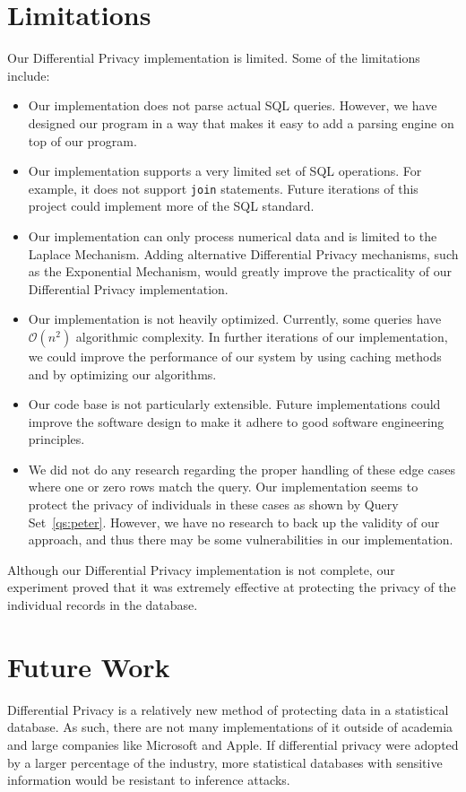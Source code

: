 \documentclass[conference,11pt]{IEEEtran}
\begin{document}
\section{Limitations}\label{sec:limitations}
Our Differential Privacy implementation is limited. Some of the limitations
include:
\begin{itemize}
    \item Our implementation does not parse actual SQL queries. However, we
        have designed our program in a way that makes it easy to add a parsing
        engine on top of our program.
    \item Our implementation supports a very limited set of SQL operations. For
        example, it does not support \texttt{join} statements.  Future
        iterations of this project could implement more of the SQL standard.
    \item Our implementation can only process numerical data and is limited to
        the Laplace Mechanism. Adding alternative Differential Privacy
        mechanisms, such as the Exponential Mechanism, would greatly improve the
        practicality of our Differential Privacy implementation.
    \item Our implementation is not heavily optimized. Currently, some queries
        have $\mathcal{O}(n^2)$ algorithmic complexity. In further iterations of
        our implementation, we could improve the performance of our system by
        using caching methods and by optimizing our algorithms.
    \item Our code base is not particularly extensible. Future implementations
        could improve the software design to make it adhere to good software
        engineering principles.
    \item We did not do any research regarding the proper handling of these edge
        cases where one or zero rows match the query. Our implementation seems
        to protect the privacy of individuals in these cases as shown by Query
        Set~\ref{qs:peter}. However, we have no research to back up the validity
        of our approach, and thus there may be some vulnerabilities in our
        implementation.
\end{itemize}

Although our Differential Privacy implementation is not complete, our experiment
proved that it was extremely effective at protecting the privacy of the
individual records in the database.

\section{Future Work}\label{sec:future-work}
Differential Privacy is a relatively new method of protecting data in a
statistical database. As such, there are not many implementations of it outside
of academia and large companies like Microsoft and Apple. If differential
privacy were adopted by a larger percentage of the industry, more statistical
databases with sensitive information would be resistant to inference attacks.
\end{document}
